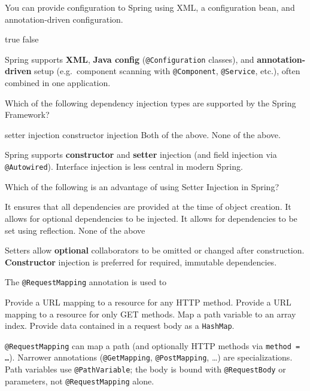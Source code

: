 \question[4]
You can provide configuration to Spring using XML, a configuration bean, and annotation-driven configuration.
\begin{choices}
  \CorrectChoice true
  \choice false
\end{choices}
\begin{solution}
  Spring supports \textbf{XML}, \textbf{Java config} (\texttt{@Configuration} classes), and \textbf{annotation-driven} setup (e.g.\ component scanning with \texttt{@Component}, \texttt{@Service}, etc.), often combined in one application.
\end{solution}

\question[4]
Which of the following dependency injection types are supported by the Spring Framework?
\begin{choices}
  \choice setter injection
  \choice constructor injection
  \CorrectChoice Both of the above.
  \choice None of the above.
\end{choices}
\begin{solution}
  Spring supports \textbf{constructor} and \textbf{setter} injection (and field injection via \texttt{@Autowired}). Interface injection is less central in modern Spring.
\end{solution}

\question[4]
Which of the following is an advantage of using Setter Injection in Spring?
\begin{choices}
  \choice It ensures that all dependencies are provided at the time of object creation.
  \CorrectChoice It allows for optional dependencies to be injected.
  \choice It allows for dependencies to be set using reflection.
  \choice None of the above
\end{choices}
\begin{solution}
  Setters allow \textbf{optional} collaborators to be omitted or changed after construction. \textbf{Constructor} injection is preferred for required, immutable dependencies.
\end{solution}

\question[4]
The \texttt{@RequestMapping} annotation is used to
\begin{choices}
  \CorrectChoice Provide a URL mapping to a resource for any HTTP method.
  \choice Provide a URL mapping to a resource for only GET methods.
  \choice Map a path variable to an array index.
  \choice Provide data contained in a request body as a \texttt{HashMap}.
\end{choices}
\begin{solution}
  \texttt{@RequestMapping} can map a path (and optionally HTTP methods via \texttt{method = \ldots}). Narrower annotations (\texttt{@GetMapping}, \texttt{@PostMapping}, \ldots) are specializations. Path variables use \texttt{@PathVariable}; the body is bound with \texttt{@RequestBody} or parameters, not \texttt{@RequestMapping} alone.
\end{solution}

